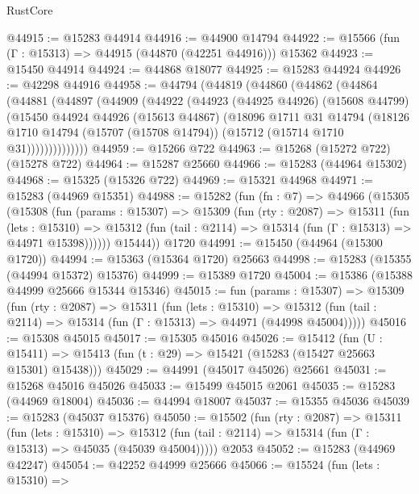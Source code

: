 \begin{lexlean}{RustCore}
\begin{coremodule}
@44915 := @15283 @44914
@44916 := @44900 @14794
@44922 := @15566 (fun (Γ : @15313) => @44915 (@44870 (@42251 @44916))) @15362
@44923 := @15450 @44914
@44924 := @44868 @18077
@44925 := @15283 @44924
@44926 := @42298 @44916
@44958 := @44794
    (@44819
      (@44860
        (@44862
          (@44864
            (@44881
              (@44897
                (@44909
                  (@44922
                    (@44923
                      (@44925 @44926)
                      (@15608 @44799)
                      (@15450
                        @44924
                        @44926
                        (@15613 @44867)
                        (@18096
                          @1711
                          @31
                          @14794
                          (@18126
                            @1710
                            @14794
                            (@15707 (@15708 @14794))
                            (@15712 (@15714 @1710 @31))))))))))))))
@44959 := @15266 @722
@44963 := @15268 (@15272 @722) (@15278 @722)
@44964 := @15287 @25660
@44966 := @15283 (@44964 @15302)
@44968 := @15325 (@15326 @722)
@44969 := @15321 @44968
@44971 := @15283 (@44969 @15351)
@44988 := @15282
    (fun (fn : @7) =>
    @44966
      (@15305
        (@15308
          (fun (params : @15307) =>
          @15309
            (fun (rty : @2087) =>
            @15311
              (fun (lets : @15310) =>
              @15312 (fun (tail : @2114) => @15314 (fun (Γ : @15313) => @44971 @15398))))))
        @15444))
    @1720
@44991 := @15450 (@44964 (@15300 @1720))
@44994 := @15363 (@15364 @1720) @25663
@44998 := @15283 (@15355 (@44994 @15372) @15376)
@44999 := @15389 @1720
@45004 := @15386 (@15388 @44999 @25666 @15344 @15346)
@45015 := fun (params : @15307) =>
  @15309
    (fun (rty : @2087) =>
    @15311
      (fun (lets : @15310) =>
      @15312 (fun (tail : @2114) => @15314 (fun (Γ : @15313) => @44971 (@44998 @45004)))))
@45016 := @15308 @45015
@45017 := @15305 @45016
@45026 := @15412
    (fun (U : @15411) => @15413 (fun (t : @29) => @15421 (@15283 (@15427 @25663 @15301) @15438)))
@45029 := @44991 (@45017 @45026) @25661
@45031 := @15268 @45016 @45026
@45033 := @15499 @45015 @2061
@45035 := @15283 (@44969 @18004)
@45036 := @44994 @18007
@45037 := @15355 @45036
@45039 := @15283 (@45037 @15376)
@45050 := @15502
    (fun (rty : @2087) =>
    @15311
      (fun (lets : @15310) =>
      @15312 (fun (tail : @2114) => @15314 (fun (Γ : @15313) => @45035 (@45039 @45004)))))
    @2053
@45052 := @15283 (@44969 @42247)
@45054 := @42252 @44999 @25666
@45066 := @15524
    (fun (lets : @15310) =>

\end{coremodule}
\end{lexlean}

